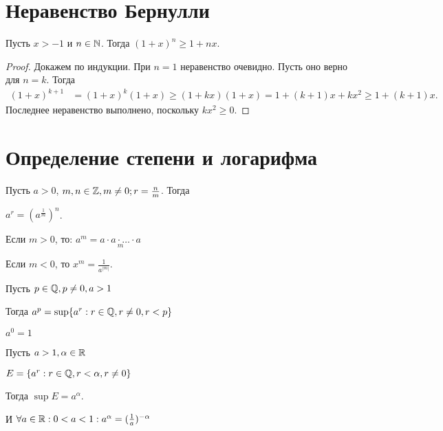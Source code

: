 


\section{Неравенство Бернулли}

\begin{theorem}
    Пусть $x > -1$ и $n \in \mathbb{N}$. Тогда $(1 + x)^n \ge 1 + nx$.

\end{theorem}

\begin{proof}
    Докажем по индукции. При $n = 1$ неравенство очевидно. Пусть оно верно для $n = k$. Тогда
    \begin{align*}
        (1 + x)^{k+1} &= (1 + x)^k (1 + x) \ge (1 + kx)(1 + x) = 1 + (k+1)x + kx^2 \ge 1 + (k+1)x.
    \end{align*}
    Последнее неравенство выполнено, поскольку $kx^2 \ge 0$.
\end{proof}

\section{Определение степени и логарифма}

\begin{definition}
    Пусть $a > 0$, $m, n \in \mathbb{Z}, m \neq 0; r = \frac{n}{m}$. Тогда 
    
    $a^r = (a^{\frac{1}{m}})^n$.

    Если $m > 0$, то: $a^m = \underset{m}{a \cdot a \cdot \ldots \cdot a}$

    Если $m < 0$, то $x^m = \frac{1}{a^{|m|}}$.
\end{definition}


\begin{definition}
    Пусть $p \in \mathbb{Q}, p \neq 0, a > 1$

    Тогда $a^p = \sup\{a^r: r \in \mathbb{Q}, r \neq 0, r < p\}$

    $a^0 = 1$
\end{definition}



\begin{definition}
    Пусть $a > 1, \alpha \in \mathbb{R}$

    $E = \{a^r: r \in \mathbb{Q}, r < \alpha, r \neq 0\}$

    Тогда $\sup E = a^\alpha$.

    И $\forall a \in \mathbb{R}: 0 < a < 1: a^\alpha = (\frac{1}{a})^{-\alpha}$
\end{definition}


